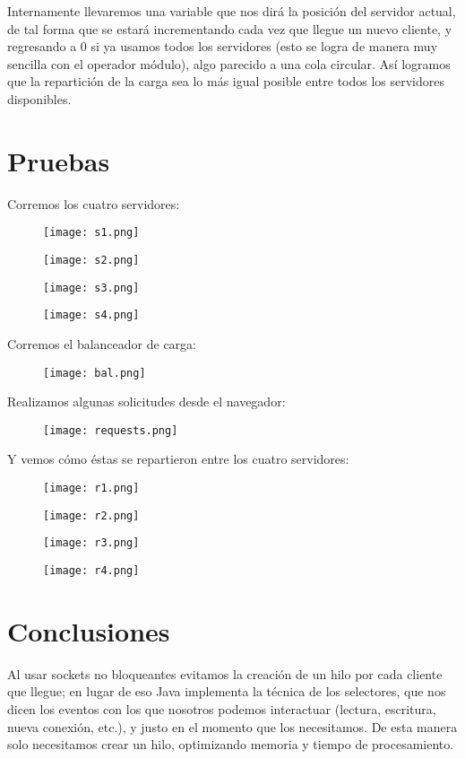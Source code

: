 \documentclass[15pt]{article}
\begin{document}
		Internamente llevaremos una variable que nos dirá la posición del servidor actual, de tal forma que se estará incrementando cada vez que llegue un nuevo cliente, y regresando a 0 si ya usamos todos los servidores (esto se logra de manera muy sencilla con el operador módulo), algo parecido a una cola circular. Así logramos que la repartición de la carga sea lo más igual posible entre todos los servidores disponibles.
	
	\clearpage
	\section{Pruebas}
		Corremos los cuatro servidores:
		\begin{figure}[H]
			\centering
			\texttt{[image: s1.png]}
		\end{figure}
		\begin{figure}[H]
			\centering
			\texttt{[image: s2.png]}
		\end{figure}
		\begin{figure}[H]
			\centering
			\texttt{[image: s3.png]}
		\end{figure}
		\begin{figure}[H]
			\centering
			\texttt{[image: s4.png]}
		\end{figure}
		
		\clearpage
		Corremos el balanceador de carga:
		\begin{figure}[H]
			\centering
			\texttt{[image: bal.png]}
		\end{figure}
		
		\clearpage
		Realizamos algunas solicitudes desde el navegador:
		\begin{figure}[H]
			\centering
			\texttt{[image: requests.png]}
		\end{figure}
	
		Y vemos cómo éstas se repartieron entre los cuatro servidores:
		\begin{figure}[H]
			\centering
			\texttt{[image: r1.png]}
		\end{figure}
		\begin{figure}[H]
			\centering
			\texttt{[image: r2.png]}
		\end{figure}
		\begin{figure}[H]
			\centering
			\texttt{[image: r3.png]}
		\end{figure}
		\begin{figure}[H]
			\centering
			\texttt{[image: r4.png]}
		\end{figure}
		
	
	\clearpage
	\section{Conclusiones}
		Al usar sockets no bloqueantes evitamos la creación de un hilo por cada cliente que llegue; en lugar de eso Java implementa la técnica de los selectores, que nos dicen los eventos con los que nosotros podemos interactuar (lectura, escritura, nueva conexión, etc.), y justo en el momento que los necesitamos. De esta manera solo necesitamos crear un hilo, optimizando memoria y tiempo de procesamiento.
	
	
\end{document}
